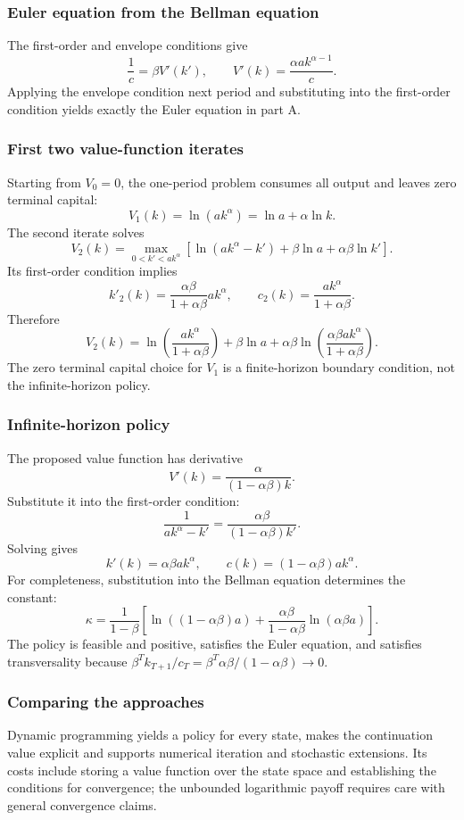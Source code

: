 \subsubsection{Euler equation from the Bellman equation}
The first-order and envelope conditions give
\[
\frac{1}{c}=\beta V'(k'),\qquad V'(k)=\frac{\alpha a k^{\alpha-1}}{c}.
\]
Applying the envelope condition next period and substituting into the first-order condition yields exactly the Euler equation in part A.

\subsubsection{First two value-function iterates}
Starting from $V_0=0$, the one-period problem consumes all output and leaves zero terminal capital:
\[
V_1(k)=\ln(a k^{\alpha})=\ln a+\alpha\ln k.
\]
The second iterate solves
\[
V_2(k)=\max_{0<k'<a k^{\alpha}}\left[\ln(a k^{\alpha}-k')+\beta\ln a+\alpha\beta\ln k'\right].
\]
Its first-order condition implies
\[
k'_2(k)=\frac{\alpha\beta}{1+\alpha\beta}a k^{\alpha},\qquad
c_2(k)=\frac{a k^{\alpha}}{1+\alpha\beta}.
\]
Therefore
\[
V_2(k)=\ln\left(\frac{a k^{\alpha}}{1+\alpha\beta}\right)+\beta\ln a
+\alpha\beta\ln\left(\frac{\alpha\beta a k^{\alpha}}{1+\alpha\beta}\right).
\]
The zero terminal capital choice for $V_1$ is a finite-horizon boundary condition, not the infinite-horizon policy.

\subsubsection{Infinite-horizon policy}
The proposed value function has derivative
\[
V'(k)=\frac{\alpha}{(1-\alpha\beta)k}.
\]
Substitute it into the first-order condition:
\[
\frac{1}{a k^{\alpha}-k'}=\frac{\alpha\beta}{(1-\alpha\beta)k'}.
\]
Solving gives
\[
k'(k)=\alpha\beta a k^{\alpha},\qquad c(k)=(1-\alpha\beta)a k^{\alpha}.
\]
For completeness, substitution into the Bellman equation determines the constant:
\[
\kappa=\frac{1}{1-\beta}\left[\ln((1-\alpha\beta)a)+\frac{\alpha\beta}{1-\alpha\beta}\ln(\alpha\beta a)\right].
\]
The policy is feasible and positive, satisfies the Euler equation, and satisfies transversality because $\beta^T k_{T+1}/c_T=\beta^T\alpha\beta/(1-\alpha\beta)\to0$.

\subsubsection{Comparing the approaches}
Dynamic programming yields a policy for every state, makes the continuation value explicit and supports numerical iteration and stochastic extensions. Its costs include storing a value function over the state space and establishing the conditions for convergence; the unbounded logarithmic payoff requires care with general convergence claims.

